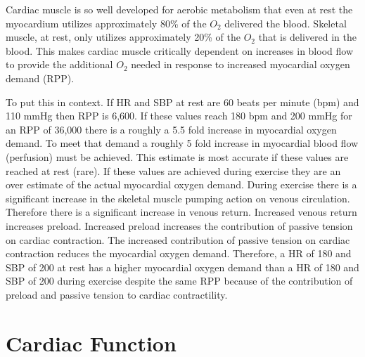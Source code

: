 Cardiac muscle is so well developed for aerobic metabolism that even at rest the myocardium utilizes approximately 80\% of the $O_2$ delivered the blood. Skeletal muscle, at rest, only utilizes approximately 20\% of the $O_2$ that is delivered in the blood. This makes cardiac muscle critically dependent on increases in blood flow to provide the additional $O_2$ needed in response to increased myocardial oxygen demand (RPP).

To put this in context. If HR and SBP at rest are 60 beats per minute (bpm) and 110 mmHg then RPP is 6,600. If these values reach 180 bpm and 200 mmHg for an RPP of 36,000 there is a roughly a 5.5 fold increase in myocardial oxygen demand. To meet that demand a roughly 5 fold increase in myocardial blood flow (perfusion) must be achieved. This estimate is most accurate if these values are reached at rest (rare). If these values are achieved during exercise they are an over estimate of the actual myocardial oxygen demand. During exercise there is a significant increase in the skeletal muscle pumping action on venous circulation. Therefore there is a significant increase in venous return. Increased venous return increases preload. Increased preload increases the contribution of passive tension on cardiac contraction. The increased contribution of passive tension on cardiac contraction reduces the myocardial oxygen demand. 
Therefore, a HR of 180 and SBP of 200 at rest has a higher myocardial oxygen demand than a HR of 180 and SBP of 200 during exercise despite the same RPP because of the contribution of preload and passive tension to cardiac contractility.

\section{Cardiac Function}

